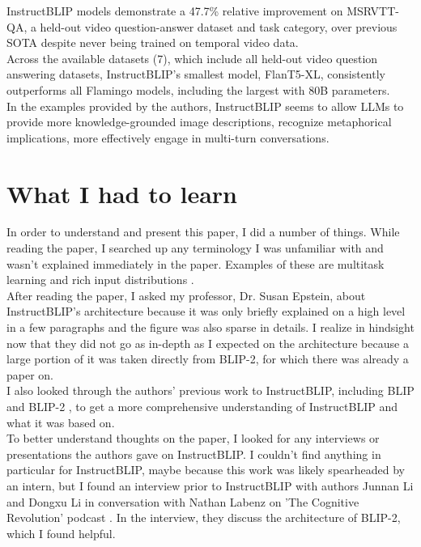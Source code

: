 \documentclass[12pt, letterpaper]{article}
\begin{document}
\begin{spacing}{1.10}
InstructBLIP models demonstrate a 47.7\% relative improvement on MSRVTT-QA, a held-out video question-answer dataset and task category, over previous SOTA despite never being trained on temporal video data.\\

Across the available datasets (7), which include all held-out video question answering datasets, InstructBLIP's smallest model, FlanT5-XL, consistently outperforms all Flamingo models, including the largest with 80B parameters.\\

In the examples provided by the authors, InstructBLIP seems to allow LLMs to provide more knowledge-grounded image descriptions, recognize metaphorical implications, more effectively engage in multi-turn conversations. 

\section{What I had to learn}
\label{sec:learn}
\leavevmode\par\noindent
In order to understand and present this paper, I did a number of things. While reading the paper, I searched up any terminology I was unfamiliar with and wasn't explained immediately in the paper. Examples of these are multitask learning \cite{geeksforgeeks2023mtl} and rich input distributions \cite{han2022cropmixsamplingrichinput}.\\

After reading the paper, I asked my professor, Dr. Susan Epstein, about InstructBLIP's architecture because it was only briefly explained on a high level in a few paragraphs and the figure was also sparse in details. I realize in hindsight now that they did not go as in-depth as I expected on the architecture because a large portion of it was taken directly from BLIP-2, for which there was already a paper on.\\

I also looked through the authors' previous work to InstructBLIP, including BLIP \cite{li2022blipbootstrappinglanguageimagepretraining} and BLIP-2 \cite{li2023blip2bootstrappinglanguageimagepretraining}, to get a more comprehensive understanding of InstructBLIP and what it was based on.\\

To better understand thoughts on the paper, I looked for any interviews or presentations the authors gave on InstructBLIP. I couldn't find anything in particular for InstructBLIP, maybe because this work was likely spearheaded by an intern, but I found an interview prior to InstructBLIP with authors Junnan Li and Dongxu Li in conversation with Nathan Labenz on 'The Cognitive Revolution' podcast \cite{labenz2023ai}. In the interview, they discuss the architecture of BLIP-2, which I found helpful.\\


\end{spacing}
\end{document}
